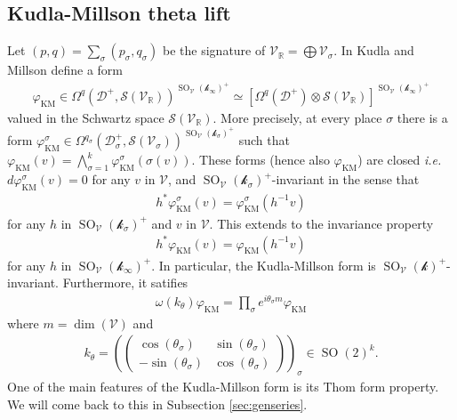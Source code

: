 \documentclass[11pt]{article} %
\newcommand{\8}{\infty}
\newcommand{\kbf}{\mathcal{k}}
\newcommand{\SO}{\operatorname{SO}}
\newcommand{\KM}{\operatorname{KM}}
\newcommand{\D}{\mathcal{D}}
\newcommand{\R}{\mathbb{R}}
\newcommand{\Scal}{\mathcal{S}}
\newcommand{\Vcal}{\mathcal{V}}
\theoremstyle{mytheoremstyle}
\theoremstyle{remark}
\numberwithin{equation}{section}
\begin{document}
\subsection{Kudla-Millson theta lift} \label{subseckm}
Let ${ (p,q) =\sum_\sigma (p_\sigma,q_\sigma)}$ be the signature of $\Vcal_\R = \bigoplus \Vcal_\sigma$. In \cite{km2,km3} Kudla and Millson define a form \begin{align}
    \varphi_{\KM} \in \Omega^{q}(\D^+,\Scal(\Vcal_\R))^{\SO_\Vcal(\kbf_\8)^+} \simeq \left [\Omega^{q}(\D^+) \otimes \Scal(\Vcal_\R) \right ]^{\SO_\Vcal(\kbf_\8)^+}
\end{align} valued in the Schwartz space $\Scal(\Vcal_\R)$. More precisely, at every place $\sigma$ there is a form $\varphi_{\KM}^{\sigma} \in \Omega^{q_\sigma}(\D_\sigma^+,\Scal(\Vcal_\sigma))^{\SO_\Vcal(\kbf_\sigma)^+}$ such that $\varphi_{\KM}(v)=\bigwedge_{\sigma=1}^k \varphi_{\KM}^{\sigma}(\sigma(v))$. These forms (hence also $\varphi_{\KM}$) are closed {\em i.e.} $d\varphi_{\KM}^{\sigma}(v)=0$ for any $v$ in $\Vcal$, and $\SO_\Vcal(\kbf_\sigma)^+$-invariant in the sense that 
\begin{align}
    h^\ast \varphi_{\KM}^{\sigma}(v)=\varphi_{\KM}^{\sigma}(h^{-1}v)
\end{align} for any $h$ in $\SO_\Vcal(\kbf_\sigma)^+$ and $v$ in $\Vcal$. This extends to the invariance property
\begin{align} \label{invariance}
    h^\ast \varphi_{\KM}(v)=\varphi_{\KM}(h^{-1}v)
\end{align} for any $h$ in $\SO_\Vcal(\kbf_\8)^+$.
In particular, the Kudla-Millson form is $\SO_{\Vcal}(\kbf)^+$-invariant. Furthermore, it satifies
\begin{align}
\omega(k_\theta)\varphi_{\KM}=\prod_\sigma e^{i \theta_\sigma m} \varphi_{\KM} 
\end{align} where { $m=\dim(\Vcal)$} and
\begin{align}
    k_\theta= \left (\begin{pmatrix}
    \cos(\theta_\sigma) & \sin(\theta_\sigma) \\ -\sin(\theta_\sigma) & \cos(\theta_\sigma)
\end{pmatrix} \right )_\sigma \in \SO(2)^k.
\end{align}
One of the main features of the Kudla-Millson form is its Thom form property. We will come back to this in  Subsection \ref{sec:genseries}.
\end{document}
